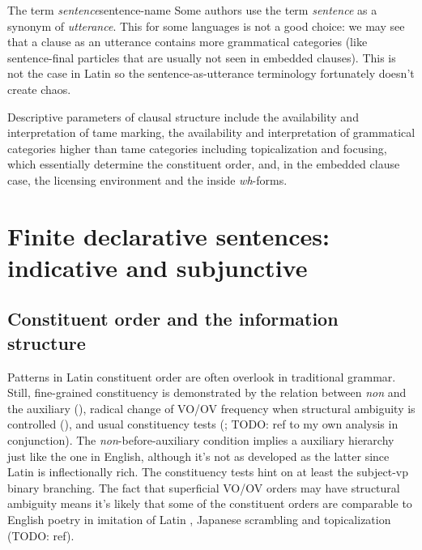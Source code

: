 \documentclass[a4paper, oneside, 12pt]{report}
\newcommand*{\citesec}[1]{\S~{#1}}
\newcommand*{\term}[1]{\emph{#1}}
\newcommand{\form}[1]{\emph{#1}}
\begin{document}
\begin{infobox}{The term \term{sentence}}{sentence-name}
    Some authors use the term \term{sentence}
    as a synonym of \term{utterance}.
    This for some languages is not a good choice: 
    we may see that a clause as an utterance 
    contains more grammatical categories 
    (like sentence-final particles that are usually not seen in embedded clauses).
    This is not the case in Latin
    so the sentence-as-utterance terminology fortunately 
    doesn't create chaos.
\end{infobox}

Descriptive parameters of clausal structure include 
the availability and interpretation of \acs{tame} marking, 
the availability and interpretation of  
grammatical categories higher than \acs{tame} categories
including topicalization and focusing,
which essentially determine the constituent order, 
and, in the embedded clause case, 
the licensing environment
and the inside \form{wh}-forms.

\section{Finite declarative sentences: indicative and subjunctive}




\subsection{Constituent order and the information structure}\label{sec:clause.order}

Patterns in Latin constituent order are often overlook in traditional grammar.
Still, fine-grained constituency is demonstrated by 
the relation between \form{non} and the auxiliary 
(),
radical change of VO/OV frequency when structural ambiguity is controlled
(),
and usual constituency tests 
(\citealt[\citesec{1.6}]{danckaert2017development}; TODO: ref to my own analysis in conjunction).
The \form{non}-before-auxiliary condition implies 
a auxiliary hierarchy just like the one in English, 
although it's not as developed as the latter 
since Latin is inflectionally rich.
The constituency tests hint on 
at least the subject-\acs{vp} binary branching.
The fact that superficial VO/OV orders may have structural ambiguity 
means it's likely that some of the constituent orders 
are comparable to
English poetry in imitation of Latin \citep[\citesec{600}]{allen1903allen},
Japanese scrambling and topicalization (TODO: ref).
\end{document}

